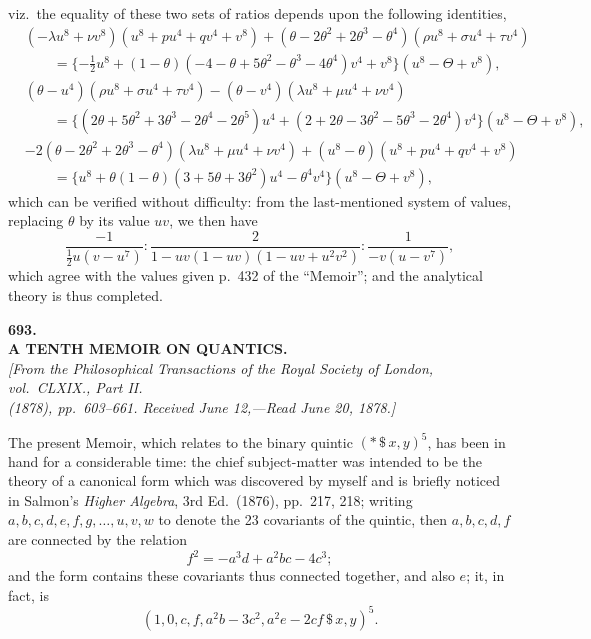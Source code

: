 \documentclass[11pt]{article}
\begin{document}
viz.\ the equality of these two sets of ratios depends upon the following identities,
\begin{align*}
&(-\lambda u^{8} + \nu v^{8})(u^{8} + pu^{4} + qv^{4} + v^{8}) + (\theta - 2\theta^{2} + 2\theta^{3} - \theta^{4})(\rho u^{8} + \sigma u^{4} + \tau v^{4})\\
&\qquad = \{-\tfrac{1}{2}u^{8} + (1 - \theta)(-4 - \theta + 5\theta^{2} - \theta^{3} - 4\theta^{4})v^{4} + v^{8}\}(u^{8} - \Theta + v^{8}),\\[4pt]
&(\theta - u^{4})(\rho u^{8} + \sigma u^{4} + \tau v^{4}) - (\theta - v^{4})(\lambda u^{8} + \mu u^{4} + \nu v^{4})\\
&\qquad = \{(2\theta + 5\theta^{2} + 3\theta^{3} - 2\theta^{4} - 2\theta^{5})u^{4} + (2 + 2\theta - 3\theta^{2} - 5\theta^{3} - 2\theta^{4})v^{4}\}(u^{8} - \Theta + v^{8}),\\[4pt]
&-2(\theta - 2\theta^{2} + 2\theta^{3} - \theta^{4})(\lambda u^{8} + \mu u^{4} + \nu v^{4}) + (u^{8} - \theta)(u^{8} + pu^{4} + qv^{4} + v^{8})\\
&\qquad = \{u^{8} + \theta(1 - \theta)(3 + 5\theta + 3\theta^{2})u^{4} - \theta^{4}v^{4}\}(u^{8} - \Theta + v^{8}),
\end{align*}
which can be verified without difficulty: from the last-mentioned system of values, replacing $\theta$ by its value $uv$, we then have
\[
\frac{-1}{\tfrac{1}{2}u(v - u^{7})} : \frac{2}{1 - uv(1 - uv)(1 - uv + u^{2}v^{2})} : \frac{1}{-v(u - v^{7})},
\]
which agree with the values given p.~432 of the ``Memoir''; and the analytical theory is thus completed.

\bigskip


\begin{center}
{\Large\bfseries 693.}\\[8pt]
{\large\bfseries A TENTH MEMOIR ON QUANTICS.}\\[6pt]
\textit{[From the Philosophical Transactions of the Royal Society of London, vol.~CLXIX., Part II.\\ (1878), pp.~603--661. Received June 12,---Read June 20, 1878.]}
\end{center}

\medskip

\noindent The present Memoir, which relates to the binary quintic $(*\,\$\,x, y)^{5}$, has been in hand for a considerable time: the chief subject-matter was intended to be the theory of a canonical form which was discovered by myself and is briefly noticed in Salmon's \textit{Higher Algebra}, 3rd Ed.\ (1876), pp.~217, 218; writing $a, b, c, d, e, f, g, \ldots, u, v, w$ to denote the 23 covariants of the quintic, then $a, b, c, d, f$ are connected by the relation
\[
f^{2} = -a^{3}d + a^{2}bc - 4c^{3};
\]
and the form contains these covariants thus connected together, and also $e$; it, in fact, is
\[
(1, 0, c, f, a^{2}b - 3c^{2}, a^{2}e - 2cf\,\$\,x, y)^{5}.
\]
\end{document}
